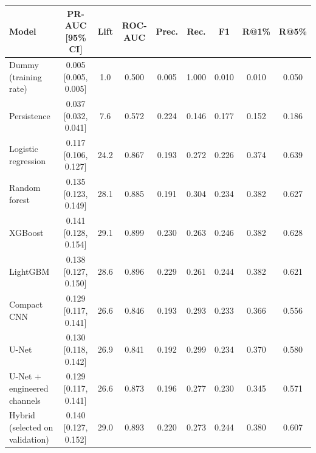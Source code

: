 \begin{tabular}{lcccccccc}
\toprule
Model & PR-AUC [95\% CI] & Lift & ROC-AUC & Prec. & Rec. & F1 & R@1\% & R@5\% \\
\midrule
Dummy (training rate) & 0.005 [0.005, 0.005] & 1.0 & 0.500 & 0.005 & 1.000 & 0.010 & 0.010 & 0.050 \\
Persistence & 0.037 [0.032, 0.041] & 7.6 & 0.572 & 0.224 & 0.146 & 0.177 & 0.152 & 0.186 \\
Logistic regression & 0.117 [0.106, 0.127] & 24.2 & 0.867 & 0.193 & 0.272 & 0.226 & 0.374 & 0.639 \\
Random forest & 0.135 [0.123, 0.149] & 28.1 & 0.885 & 0.191 & 0.304 & 0.234 & 0.382 & 0.627 \\
XGBoost & 0.141 [0.128, 0.154] & 29.1 & 0.899 & 0.230 & 0.263 & 0.246 & 0.382 & 0.628 \\
LightGBM & 0.138 [0.127, 0.150] & 28.6 & 0.896 & 0.229 & 0.261 & 0.244 & 0.382 & 0.621 \\
Compact CNN & 0.129 [0.117, 0.141] & 26.6 & 0.846 & 0.193 & 0.293 & 0.233 & 0.366 & 0.556 \\
U-Net & 0.130 [0.118, 0.142] & 26.9 & 0.841 & 0.192 & 0.299 & 0.234 & 0.370 & 0.580 \\
U-Net + engineered channels & 0.129 [0.117, 0.141] & 26.6 & 0.873 & 0.196 & 0.277 & 0.230 & 0.345 & 0.571 \\
Hybrid (selected on validation) & 0.140 [0.127, 0.152] & 29.0 & 0.893 & 0.220 & 0.273 & 0.244 & 0.380 & 0.607 \\
\bottomrule
\end{tabular}
